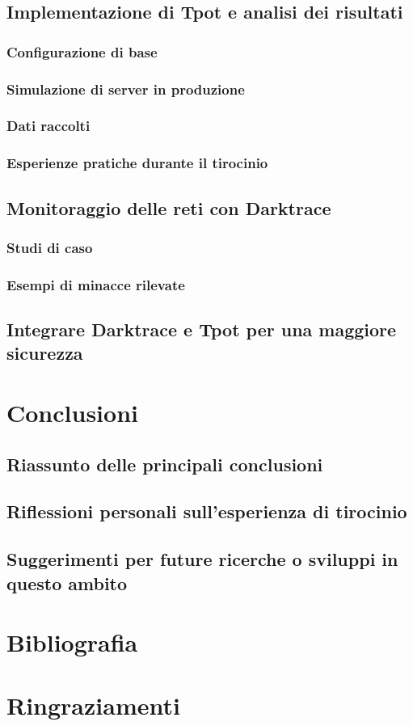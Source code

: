 \documentclass[12pt,a4paper,oneside,onecolumn,openright]{book}
\begin{document}
\section{Implementazione di Tpot e analisi dei risultati}
\subsection{Configurazione di base}
\subsection{Simulazione di server in produzione}
\subsection{Dati raccolti}
\subsection{Esperienze pratiche durante il tirocinio}

\section{Monitoraggio delle reti con Darktrace}
\subsection{Studi di caso}
\subsection{Esempi di minacce rilevate}

\section{Integrare Darktrace e Tpot per una maggiore sicurezza}

\chapter{Conclusioni}
\section{Riassunto delle principali conclusioni}
\section{Riflessioni personali sull'esperienza di tirocinio}
\section{Suggerimenti per future ricerche o sviluppi in questo ambito}

\chapter{Bibliografia}

\chapter{Ringraziamenti}
\end{document}
